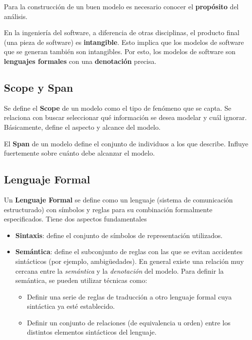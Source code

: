 \documentclass[]{article}
\begin{document}
Para la construcción de un buen modelo es necesario conocer el \textbf{propósito} del análisis.

En la ingeniería del software, a diferencia de otras disciplinas, el producto final (una pieza de software) es \textbf{intangible}. Esto implica que los modelos de software que se generan también son intangibles. Por esto, los modelos de software son \textbf{lenguajes formales} con una \textbf{denotación} precisa.

\subsection{Scope y Span}

Se define el \textbf{Scope} de un modelo como el tipo de fenómeno que se capta. Se relaciona con buscar seleccionar qué información se desea modelar y cuál ignorar. Básicamente, define el aspecto y alcance del modelo.

El \textbf{Span} de un modelo define el conjunto de individuos a los que describe. Influye fuertemente sobre cuánto debe alcanzar el modelo.

\subsection{Lenguaje Formal}

Un \textbf{Lenguaje Formal} se define como un lenguaje (sistema de comunicación estructurado) con símbolos y reglas para su combinación formalmente especificados. Tiene dos aspectos fundamentales
\begin{itemize}
	\item \textbf{Sintaxis}: define el conjunto de símbolos de representación utilizados.
	\item \textbf{Semántica}: define el subconjunto de reglas con las que se evitan accidentes sintácticos (por ejemplo, ambigüedades). En general existe una relación muy cercana entre la \textit{semántica} y la \textit{denotación} del modelo. Para definir la semántica, se pueden utilizar técnicas como:
	\begin{itemize}
		\item Definir una serie de reglas de traducción a otro lenguaje formal cuya sintáctica ya esté establecido.
		\item Definir un conjunto de relaciones (de equivalencia u orden) entre los distintos elementos sintácticos del lenguaje.
	\end{itemize}
\end{itemize}
\end{document}
